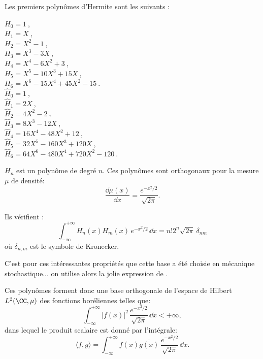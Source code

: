\medskip
{}
Les premiers polynômes d'Hermite sont les suivants :
\begin{multicols}{2}
\noindent%
   $H_0=1~$,\\
   $H_1=X~$,\\
    $H_2=X^2-1~$,\\
    $H_3=X^3-3X~$,\\
    $H_4=X^4-6X^2+3~$,\\
    $H_5=X^5-10X^3+15X~$,\\
    $H_6=X^6-15X^4+45X^2-15~$.\\

\noindent%
    $\widehat{H}_0=1~$,\\
    $\widehat{H}_1=2X~$,\\
    $\widehat{H}_2=4X^2-2~$,\\
    $\widehat{H}_3=8X^3-12X~$,\\
    $\widehat{H}_4=16X^4-48X^2+12~$,\\
    $\widehat{H}_5=32X^5-160X^3+120X~$,\\
    $\widehat{H}_6=64X^6-480X^4+720X^2-120~$.
\end{multicols}

\medskip
$H_n$ est un polynôme de degré $n$. 
Ces polynômes sont orthogonaux pour la mesure $\mu$ de densité:
\begin{equation}
    \frac{\dd\mu(x)}{\dd x} = \frac{e^{-x^2/2}}{\sqrt{2\pi}}.
\end{equation}

Ils vérifient :
\begin{equation}
    \int_{-\infty}^{+\infty} H_n(x)H_m(x)\,e^{-x^2/2}\,\dd x=n!2^n\sqrt{2\pi}~\delta_{nm}
\end{equation}
où $\delta_{n,m}$ est le symbole de Kronecker.

C'est pour ces intéressantes propriétés que cette base a été choisie en mécanique stochastique... 
on utilise alors la jolie expression de .

\medskip
Ces polynômes forment donc une base orthogonale de l'espace de Hilbert 
$L^2(\CC,\mu)$ des fonctions boréliennes telles que:
\begin{equation}
    \int_{-\infty}^{+\infty}|f(x)|^2\,\frac{e^{-x^2/2}}{\sqrt{2\pi}}\,\dd x< +\infty,
\end{equation}
dans lequel le produit scalaire est donné par l'intégrale:
\begin{equation}
    \langle f,g\rangle=\int_{-\infty}^{+\infty} f(x)\overline{g(x)}\,\frac{e^{-x^2/2}}{\sqrt{2\pi}}\,\dd x.
\end{equation}

